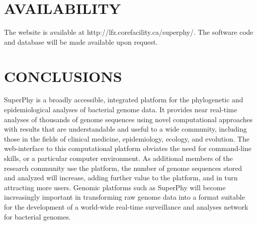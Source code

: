 \documentclass[a4paper,twoside]{article}
\begin{document}
\section{\uppercase{Availability}}
\label{sec:availability}

The website is available at http://lfz.corefacility.ca/superphy/. The software code and database will be made available upon request.

\section{\uppercase{Conclusions}}
\label{sec:conclusion}

\noindent SuperPhy is a broadly accessible, integrated platform for the phylogenetic and epidemiological analyses of bacterial genome data. It provides near real-time analyses of thousands of genome sequences using novel computational approaches with results that are understandable and useful to a wide community, including those in the fields of clinical medicine, epidemiology, ecology, and evolution. The web-interface to this computational platform obviates the need for command-line skills, or a particular computer environment. As additional members of the research community use the platform, the number of genome sequences stored and analyzed will increase, adding further value to the platform, and in turn attracting more users. Genomic platforms such as SuperPhy will become increasingly important in transforming raw genome data into a format suitable for the development of a world-wide real-time surveillance and analyses network for bacterial genomes.

\vfill

{\small
}

\vfill
\end{document}
